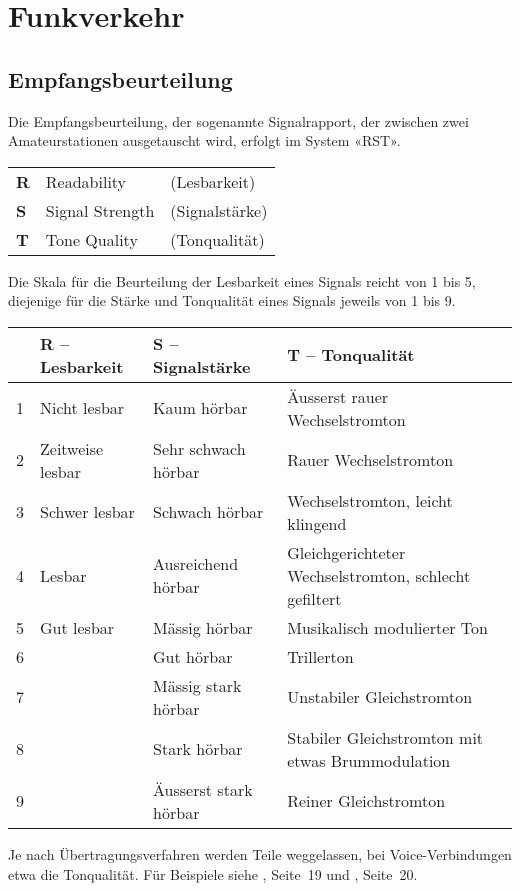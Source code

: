 \chapter{Funkverkehr}
\section{Empfangsbeurteilung}
Die Empfangsbeurteilung, der sogenannte Signalrapport, der zwischen zwei Amateurstationen aus­getauscht wird, erfolgt im System «RST».

\begin{tabular}{lll}
\textbf{R} & Readability & (Lesbarkeit) \\
\textbf{S} & Signal Strength & (Signalstärke)\\
\textbf{T} & Tone Quality & (Tonqualität)
\end{tabular}

Die Skala für die Beurteilung der Lesbarkeit eines Signals reicht von 1 bis 5, diejenige für die Stärke und Tonqualität eines Signals jeweils von 1 bis 9.


\begin{tabular}{llll}
 & R – Lesbarkeit & S – Signalstärke & T – Tonqualität \\
 \toprule
1 & Nicht lesbar & Kaum hörbar & Äusserst rauer Wechselstromton \\
2 & Zeitweise lesbar & Sehr schwach hörbar & Rauer Wechselstromton \\
3 & Schwer lesbar & Schwach hörbar & Wechselstromton, leicht klingend \\
4 & Lesbar & Ausreichend hörbar & \begin{minipage}[t]{4cm}{\raggedright Gleichgerichteter Wechsel\-strom\-ton, schlecht gefiltert}\end{minipage} \\
5 & Gut lesbar & Mässig hörbar & Musikalisch modulierter Ton \\
6 &  & Gut hörbar & Trillerton \\
7 &  & Mässig stark hörbar & Unstabiler Gleichstromton \\
8 &  & Stark hörbar & \begin{minipage}[t]{4cm}{\raggedright Stabiler Gleichstromton mit etwas Brummodulation}\end{minipage} \\
9 &  & Äusserst stark hörbar & Reiner Gleichstromton
\end{tabular}

Je nach Übertragungsverfahren werden Teile weggelassen, bei Voice-Verbindungen etwa die Tonqualität. Für Beispiele siehe , Seite 19 und , Seite 20.

